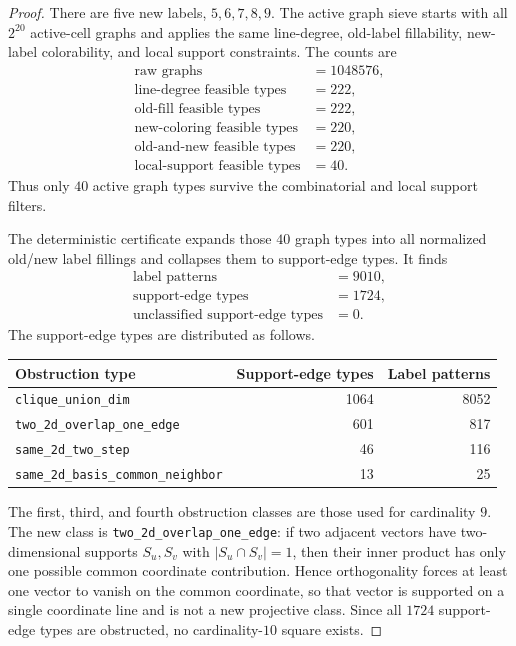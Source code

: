 \documentclass[11pt]{article}
\begin{document}
\begin{proof}
There are five new labels, \(5,6,7,8,9\).  The active graph sieve starts with
all \(2^{20}\) active-cell graphs and applies the same line-degree,
old-label fillability, new-label colorability, and local support constraints.
The counts are
\[
\begin{array}{rl}
\text{raw graphs} &= 1048576,\\
\text{line-degree feasible types} &= 222,\\
\text{old-fill feasible types} &= 222,\\
\text{new-coloring feasible types} &= 220,\\
\text{old-and-new feasible types} &= 220,\\
\text{local-support feasible types} &= 40.
\end{array}
\]
Thus only \(40\) active graph types survive the combinatorial and local
support filters.

The deterministic certificate expands those \(40\) graph types into all
normalized old/new label fillings and collapses them to support-edge types.
It finds
\[
\begin{array}{rl}
\text{label patterns} &= 9010,\\
\text{support-edge types} &= 1724,\\
\text{unclassified support-edge types} &= 0.
\end{array}
\]
The support-edge types are distributed as follows.
\begin{center}
\begin{tabular}{lrr}
\toprule
Obstruction type & Support-edge types & Label patterns \\
\midrule
\texttt{clique\_union\_dim} & 1064 & 8052 \\
\texttt{two\_2d\_overlap\_one\_edge} & 601 & 817 \\
\texttt{same\_2d\_two\_step} & 46 & 116 \\
\texttt{same\_2d\_basis\_common\_neighbor} & 13 & 25 \\
\bottomrule
\end{tabular}
\end{center}

The first, third, and fourth obstruction classes are those used for
cardinality \(9\).  The new class is
\texttt{two\_2d\_overlap\_one\_edge}: if two adjacent vectors have
two-dimensional supports \(S_u,S_v\) with \(|S_u\cap S_v|=1\), then their
inner product has only one possible common coordinate contribution.  Hence
orthogonality forces at least one vector to vanish on the common coordinate,
so that vector is supported on a single coordinate line and is not a new
projective class.  Since all \(1724\) support-edge types are obstructed, no
cardinality-\(10\) square exists.
\end{proof}
\end{document}
